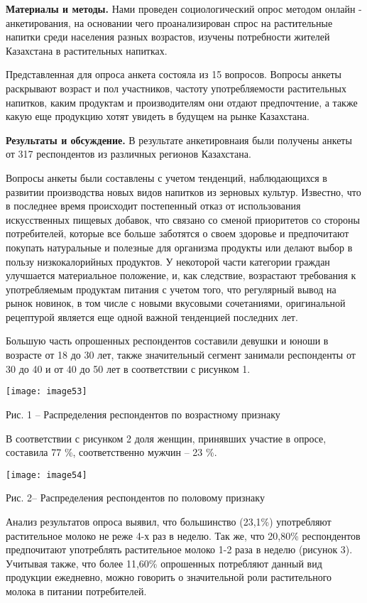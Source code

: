 {\bfseries Материалы и методы.} Нами проведен социологический опрос методом
онлайн - анкетирования, на основании чего проанализирован спрос на
растительные напитки среди населения разных возрастов, изучены
потребности жителей Казахстана в растительных напитках.

Представленная для опроса анкета состояла из 15 вопросов. Вопросы анкеты
раскрывают возраст и пол участников, частоту употребляемости
растительных напитков, каким продуктам и производителям они отдают
предпочтение, а также какую еще продукцию хотят увидеть в будущем на
рынке Казахстана.

{\bfseries Результаты и обсуждение.} В результате анкетировнаия были
получены анкеты от 317 респондентов из различных регионов Казахстана.

Вопросы анкеты были составлены с учетом тенденций, наблюдающихся в
развитии производства новых видов напитков из зерновых культур.
Известно, что в последнее время происходит постепенный отказ от
использования искусственных пищевых добавок, что связано со сменой
приоритетов со стороны потребителей, которые все больше заботятся о
своем здоровье и предпочитают покупать натуральные и полезные для
организма продукты или делают выбор в пользу низкокалорийных продуктов.
У некоторой части категории граждан улучшается материальное положение,
и, как следствие, возрастают требования к употребляемым продуктам
питания с учетом того, что регулярный вывод на рынок новинок, в том
числе с новыми вкусовыми сочетаниями, оригинальной рецептурой является
еще одной важной тенденцией последних лет.

Большую часть опрошенных респондентов составили девушки и юноши в
возрасте от 18 до 30 лет, также значительный сегмент занимали
респонденты от 30 до 40 и от 40 до 50 лет в соответствии с рисунком 1.

\texttt{[image: image53]}

Рис. 1 -- Распределения респондентов по возрастному признаку

В соответствии с рисунком 2 доля женщин, принявших участие в опросе,
составила 77 \%, соответственно мужчин -- 23 \%.

\texttt{[image: image54]}

Рис. 2-- Распределения респондентов по половому признаку

Анализ результатов опроса выявил, что большинство (23,1\%) употребляют
растительное молоко не реже 4-х раз в неделю. Так же, что 20,80\%
респондентов предпочитают употреблять растительное молоко 1-2 раза в
неделю (рисунок 3). Учитывая также, что более 11,60\% опрошенных
потребляют данный вид продукции ежедневно, можно говорить о значительной
роли растительного молока в питании потребителей.

